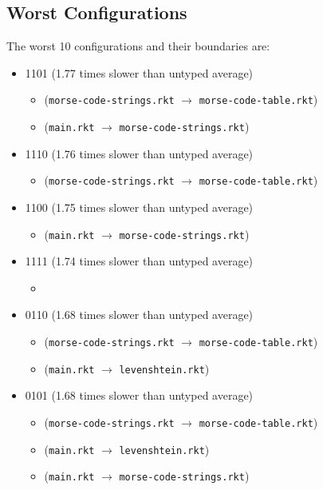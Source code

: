 \documentclass{article}
\newcommand{\mono}[1]{\texttt{#1}}
\begin{document}
\subsection{Worst Configurations}
The worst 10 configurations and their boundaries are:
\begin{itemize}
\item 1101 (1.77 times slower than untyped average)
  \begin{itemize}
  \item (\mono{morse-code-strings.rkt} $\rightarrow$ \mono{morse-code-table.rkt})
  \item (\mono{main.rkt} $\rightarrow$ \mono{morse-code-strings.rkt})
  \end{itemize}
\item 1110 (1.76 times slower than untyped average)
  \begin{itemize}
  \item (\mono{morse-code-strings.rkt} $\rightarrow$ \mono{morse-code-table.rkt})
  \end{itemize}
\item 1100 (1.75 times slower than untyped average)
  \begin{itemize}
  \item (\mono{main.rkt} $\rightarrow$ \mono{morse-code-strings.rkt})
  \end{itemize}
\item 1111 (1.74 times slower than untyped average)
  \begin{itemize}
  \item 
  \end{itemize}
\item 0110 (1.68 times slower than untyped average)
  \begin{itemize}
  \item (\mono{morse-code-strings.rkt} $\rightarrow$ \mono{morse-code-table.rkt})
  \item (\mono{main.rkt} $\rightarrow$ \mono{levenshtein.rkt})
  \end{itemize}
\item 0101 (1.68 times slower than untyped average)
  \begin{itemize}
  \item (\mono{morse-code-strings.rkt} $\rightarrow$ \mono{morse-code-table.rkt})
  \item (\mono{main.rkt} $\rightarrow$ \mono{levenshtein.rkt})
  \item (\mono{main.rkt} $\rightarrow$ \mono{morse-code-strings.rkt})
  \end{itemize}

\end{itemize}
\end{document}

